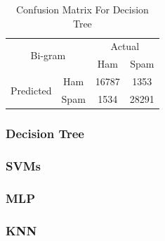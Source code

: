 \documentclass[12pt]{article}
\begin{document}
\begin{table}[H]
\begin{floatrow}
{\begin{subtable}{.5\textwidth}
				\begin{tabular}{@{}|c|c|c|c|@{}}
					\toprule
					\multicolumn{2}{|c|}{\multirow{2}{*}{Bi-gram}} & \multicolumn{2}{c|}{Actual} \\ \cmidrule(l){3-4} 
					\multicolumn{2}{|c|}{}                        & Ham          & Spam         \\ \midrule
					\multirow{2}{*}{Predicted}       & Ham        & 16787        & 1353         \\ \cmidrule(l){2-4} 
					& Spam       & 1534         & 28291        \\ \bottomrule
				\end{tabular}
			\end{subtable}
		}{  
			\caption{Confusion Matrix For Decision Tree}  
			\label{Confusion_DT}  
		}  
	\end{floatrow}
\end{table} 


\subsubsection{Decision Tree}


\subsubsection{SVMs}

\subsubsection{MLP}

\subsubsection{KNN}

\end{document}
